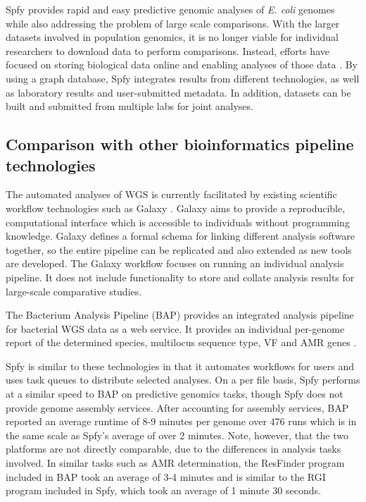 \documentclass{article}
\begin{document}
Spfy provides rapid and easy predictive genomic analyses of \textit{E. coli} genomes while also addressing the problem of large scale comparisons. With the larger datasets involved in population genomics, it is no longer viable for individual researchers to download data to perform comparisons. Instead, efforts have focused on storing biological data online and enabling analyses of those data \cite{schatz2015biological}. By using a graph database, Spfy integrates results from  different technologies, as well as laboratory results and user-submitted metadata. In addition, datasets can be built and submitted from multiple labs for joint analyses.

\subsection{Comparison with other bioinformatics pipeline technologies}


The automated analyses of WGS is currently facilitated by existing scientific workflow technologies such as Galaxy \cite{goecks2010galaxy}. Galaxy aims to provide a reproducible, computational interface which is accessible to individuals without programming knowledge. Galaxy defines a formal schema for linking different analysis software together, so the entire pipeline can be replicated and also extended as new tools are developed. The Galaxy workflow focuses on running an individual analysis pipeline. It does not include functionality to store and collate analysis results for large-scale comparative studies.

The Bacterium Analysis Pipeline (BAP) \cite{thomsen2016bacterial} provides an integrated analysis pipeline for bacterial WGS data as a web service. It provides an individual per-genome report of the determined species, multilocus sequence type, VF and AMR genes \cite{thomsen2016bacterial}.

Spfy is similar to these technologies in that it automates workflows for users and uses task queues to distribute selected analyses.
On a per file basis, Spfy performs at a similar speed to BAP on predictive genomics tasks, though Spfy does not provide genome assembly services.
After accounting for assembly services, BAP reported \cite{thomsen2016bacterial} an average runtime of 8-9 minutes per genome over 476 runs which is in the same scale as Spfy's average of over 2 minutes.
Note, however, that the two platforms are not directly comparable, due to the differences in analysis tasks involved.
In similar tasks such as AMR determination, the ResFinder program included in BAP took an average of 3-4 minutes \cite{thomsen2016bacterial} and is similar to the RGI program included in Spfy, which took an average of 1 minute 30 seconds.
\end{document}

